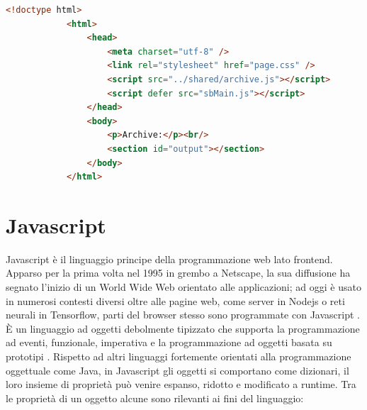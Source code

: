 \documentclass{sapthesis}
\newcommand{\www}{World Wide Web }
\newcommand{\JS}{Javascript }
\begin{document}
        \begin{lstlisting}[label={code:esempio-html},caption={Un semplice documento html},captionpos=b,language=HTML]
            <!doctype html>
            <html>
                <head>
                    <meta charset="utf-8" />
                    <link rel="stylesheet" href="page.css" />
                    <script src="../shared/archive.js"></script>
                    <script defer src="sbMain.js"></script>
                </head>
                <body>
                    <p>Archive:</p><br/>
                    <section id="output"></section>
                </body>
            </html>
        \end{lstlisting}

    
    \section{Javascript}
    \label{javascript}
        \JS è il linguaggio principe della programmazione web lato frontend. Apparso per la
        prima volta nel 1995 in grembo a Netscape, la sua diffusione ha segnato l'inizio di un \www
        orientato alle applicazioni; ad oggi è usato in numerosi contesti diversi oltre alle pagine web,
        come server in Nodejs o reti neurali in Tensorflow, parti del browser stesso sono programmate
        con \JS. 
        È un linguaggio ad oggetti debolmente tipizzato che supporta la programmazione ad eventi, 
        funzionale, imperativa e la programmazione ad oggetti basata su prototipi \cite{javascript-introduction}.
        Rispetto ad altri linguaggi fortemente orientati alla programmazione oggettuale come Java, in \JS
        gli oggetti si comportano come dizionari, il loro insieme di proprietà può venire espanso, ridotto e 
        modificato a runtime. Tra le proprietà di un oggetto alcune sono rilevanti ai fini del linguaggio:
\end{document}
